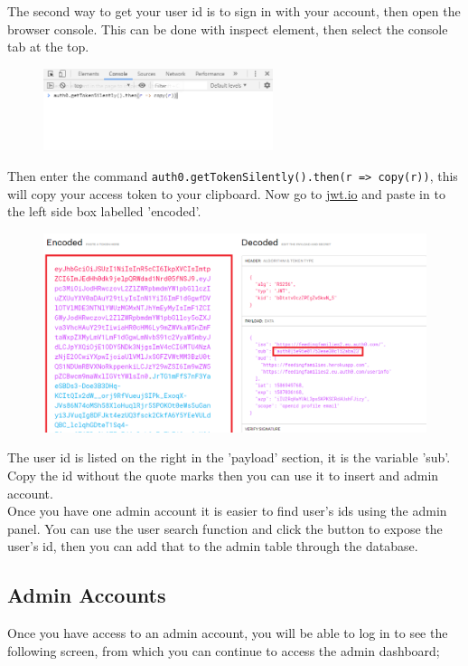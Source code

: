 \documentclass[12pt]{article}
\begin{document}
\noindent
The second way to get your user id is to sign in with your account, then open the browser console. This can be done with inspect element, then select the console tab at the top.
\begin{figure}[H]
    \centering
    \includegraphics[width=0.6\textwidth]{admins/console.png}
\end{figure}
\noindent
Then enter the command \lstinline"auth0.getTokenSilently().then(r => copy(r))", this will copy your access token to your clipboard. Now go to \href{https://jwt.io/}{jwt.io} and paste in to the left side box labelled 'encoded'. 
\begin{figure}[H]
    \centering
    \includegraphics[width=1\textwidth]{admins/jwt.png}
\end{figure}
\noindent
The user id is listed on the right in the 'payload' section, it is the variable 'sub'. Copy the id without the quote marks then you can use it to insert and admin account.\\

\noindent
Once you have one admin account it is easier to find user's ids using the admin panel. You can use the user search function and click the button to expose the user's id, then you can add that to the admin table through the database.
\newpage
\subsection{Admin Accounts}
Once you have access to an admin account, you will be able to log in to see the following screen, from which you can continue to access the admin dashboard;
\end{document}
